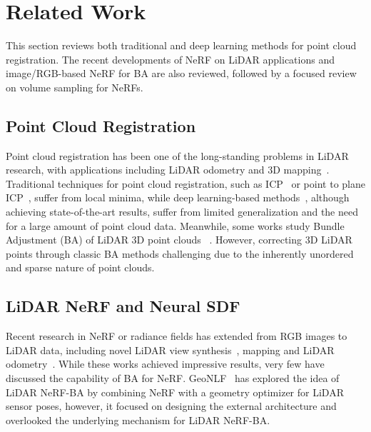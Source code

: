 \section{Related Work}
This section reviews both traditional and deep learning methods for point cloud registration. The recent developments of NeRF on LiDAR applications and image/RGB-based NeRF for BA are also reviewed, followed by a focused review on volume sampling for NeRFs.

\subsection{Point Cloud Registration}
Point cloud registration has been one of the long-standing problems in LiDAR research, with applications including LiDAR odometry and 3D mapping~\cite{Zhang2014LOAM}. Traditional techniques for point cloud registration, such as ICP~\cite{besl1992icp} or point to plane ICP~\cite{CHEN1992point2planeicp}, suffer from local minima, while deep learning-based methods~\cite{wang2023sghr,qin2023geotrans,lu2021hregnet}, although achieving state-of-the-art results, suffer from limited generalization and the need for a large amount of point cloud data. Meanwhile, some works study Bundle Adjustment (BA) of LiDAR 3D point clouds~\cite{liu2022HBA,ruhnke2012highly} \cite{liu2021balm}. However, correcting 3D LiDAR points through classic BA methods  challenging due to the inherently unordered and sparse nature of point clouds. 

\subsection{LiDAR NeRF and Neural SDF}
Recent research in NeRF or radiance fields has extended from RGB images to LiDAR data, including novel LiDAR view synthesis~\cite{zheng2024lidar4D,jiang2025gslidar}, mapping and LiDAR odometry~\cite{deng2023nerfloam,isaacson2024lonerlidar}. While these works achieved impressive results, very few have discussed the capability of BA for NeRF. GeoNLF~\cite{xue2024geonlf} has explored the idea of LiDAR NeRF-BA by combining NeRF with a geometry optimizer for LiDAR sensor poses, however, it focused on designing the external architecture and overlooked the underlying mechanism for LiDAR NeRF-BA.  

